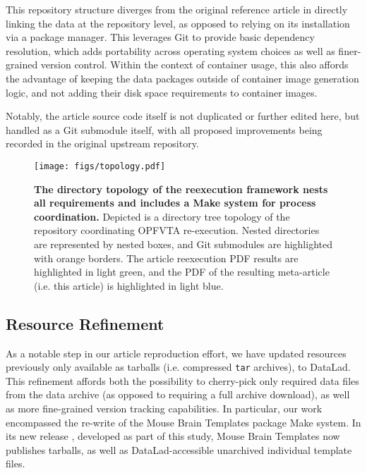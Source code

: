 This repository structure diverges from the original reference article in directly linking the data at the repository level, as opposed to relying on its installation via a package manager.
This leverages Git to provide basic dependency resolution, which adds portability across operating system choices as well as finer-grained version control.
Within the context of container usage, this also affords the advantage of keeping the data packages outside of container image generation logic, and not adding their disk space requirements to container images.

Notably, the article source code itself is not duplicated or further edited here, but handled as a Git submodule itself, with all proposed improvements being recorded in the original upstream repository.

\begin{figure*}
	\centering
	\texttt{[image: figs/topology.pdf]}
	\caption{
		\textbf{The directory topology of the reexecution framework nests all requirements and includes a Make system for process coordination.}
		Depicted is a directory tree topology of the repository coordinating OPFVTA re-execution.
		Nested directories are represented by nested boxes, and Git submodules are highlighted with orange borders.
		The article reexecution PDF results are highlighted in light green, and the PDF of the resulting meta-article (i.e. this article) is highlighted in light blue.
	}
	\label{fig:topology}
\end{figure*}




\subsection{Resource Refinement}

As a notable step in our article reproduction effort, we have updated resources previously only available as tarballs (i.e. compressed \texttt{tar} archives), to DataLad.
This refinement affords both the possibility to cherry-pick only required data files from the data archive (as opposed to requiring a full archive download), as well as more fine-grained version tracking capabilities.
In particular, our work encompassed the re-write of the Mouse Brain Templates package \cite{mbt05} Make system.
In its new release \cite{mbt10}, developed as part of this study, Mouse Brain Templates now publishes tarballs, as well as DataLad-accessible unarchived individual template files.



